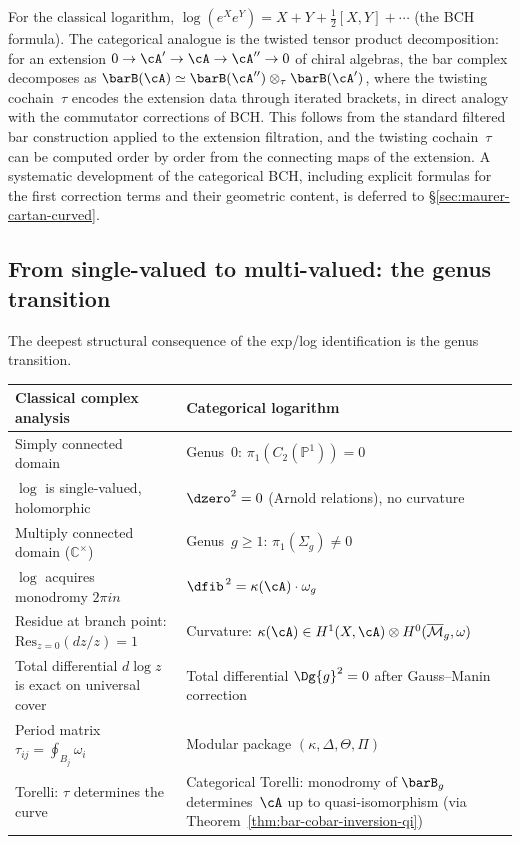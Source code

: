 \begin{remark}
\label{rem:categorical-bch}
For the classical logarithm, $\log(e^X e^Y) = X + Y + \tfrac{1}{2}[X,Y] + \cdots$
(the BCH formula).  The categorical analogue is the twisted tensor
product decomposition: for an extension
$0 \to \cA' \to \cA \to \cA'' \to 0$ of chiral algebras, the bar
complex decomposes as
$\barB(\cA) \simeq \barB(\cA'') \otimes_\tau \barB(\cA')$,
where the twisting cochain~$\tau$ encodes the extension data through
iterated brackets, in direct analogy with the commutator corrections
of BCH\@.  This follows from the standard filtered bar construction
applied to the extension filtration, and the twisting cochain~$\tau$
can be computed order by order from the connecting maps of the
extension.  A systematic development of the categorical BCH, including
explicit formulas for the first correction terms and their geometric
content, is deferred to \S\ref{sec:maurer-cartan-curved}.
\end{remark}

\subsection{From single-valued to multi-valued: the genus transition}
\label{subsec:genus-transition-log}

The deepest structural consequence of the exp/log identification is the
genus transition.

\begin{center}
\small
\renewcommand{\arraystretch}{1.3}
\begin{tabular}{p{5.5cm}p{5.5cm}}
\textbf{Classical complex analysis} & \textbf{Categorical logarithm} \\
\hline
Simply connected domain &
Genus~$0$: $\pi_1(C_2(\mathbb{P}^1)) = 0$ \\[2pt]
$\log$ is single-valued, holomorphic &
$\dzero^2 = 0$ (Arnold relations), no curvature \\[2pt]
Multiply connected domain ($\mathbb{C}^\times$) &
Genus~$g \geq 1$: $\pi_1(\Sigma_g) \neq 0$ \\[2pt]
$\log$ acquires monodromy $2\pi i n$ &
$\dfib^{\,2} = \kappa(\cA) \cdot \omega_g$ \\[2pt]
Residue at branch point: $\mathrm{Res}_{z=0}(dz/z) = 1$ &
Curvature: $\kappa(\cA) \in H^1(X, \cA) \otimes H^0(\overline{\mathcal{M}}_g, \omega)$ \\[2pt]
Total differential $d\log z$ is exact on universal cover &
Total differential $\Dg{g}^2 = 0$ after Gauss--Manin correction \\[2pt]
Period matrix $\tau_{ij} = \oint_{B_j} \omega_i$ &
Modular package $(\kappa, \Delta, \Theta, \Pi)$ \\[2pt]
Torelli: $\tau$ determines the curve &
Categorical Torelli: monodromy of $\barB_g$ determines~$\cA$
up to quasi-isomorphism (via Theorem~\ref{thm:bar-cobar-inversion-qi})
\end{tabular}
\end{center}

